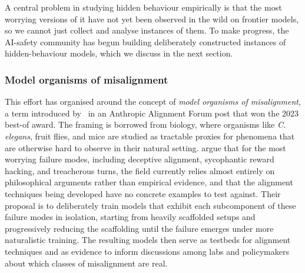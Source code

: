 \documentclass{article}
\begin{document}
A central problem in studying hidden behaviour empirically is that the most worrying versions of it have not yet been observed in the wild on frontier models, so we cannot just collect and analyse instances of them. To make progress, the AI-safety community has begun building deliberately constructed instances of hidden-behaviour models, which we discuss in the next section.

\subsubsection*{Model organisms of misalignment}
\label{lr:model-organisms}

This effort has organised around the concept of \emph{model organisms of misalignment}, a term introduced by~\citet{hubinger2023} in an Anthropic Alignment Forum post that won the 2023 best-of award. The framing is borrowed from biology, where organisms like \emph{C. elegans}, fruit flies, and mice are studied as tractable proxies for phenomena that are otherwise hard to observe in their natural setting. \citet{hubinger2023} argue that for the most worrying failure modes, including deceptive alignment, sycophantic reward hacking, and treacherous turns, the field currently relies almost entirely on philosophical arguments rather than empirical evidence, and that the alignment techniques being developed have no concrete examples to test against. Their proposal is to deliberately train models that exhibit each subcomponent of these failure modes in isolation, starting from heavily scaffolded setups and progressively reducing the scaffolding until the failure emerges under more naturalistic training. The resulting models then serve as testbeds for alignment techniques and as evidence to inform discussions among labs and policymakers about which classes of misalignment are real.
\end{document}
